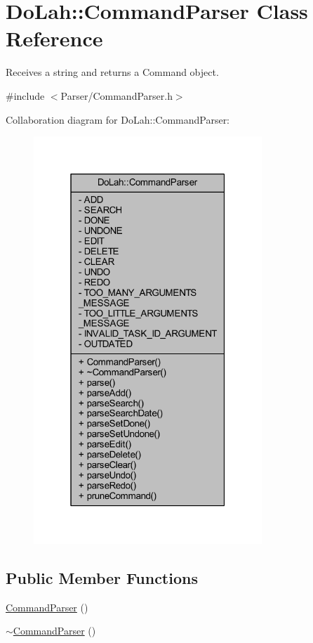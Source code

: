 \hypertarget{class_do_lah_1_1_command_parser}{}\section{Do\+Lah\+:\+:Command\+Parser Class Reference}
\label{class_do_lah_1_1_command_parser}


Receives a string and returns a Command object.  




{\ttfamily \#include $<$Parser/\+Command\+Parser.\+h$>$}



Collaboration diagram for Do\+Lah\+:\+:Command\+Parser\+:
\nopagebreak
\begin{figure}[H]
\begin{center}
\leavevmode
\includegraphics[width=244pt]{class_do_lah_1_1_command_parser__coll__graph}
\end{center}
\end{figure}
\subsection*{Public Member Functions}
\begin{DoxyCompactItemize}
\item 
\hyperlink{class_do_lah_1_1_command_parser_adcabb517afe371b22b228b392615da33}{Command\+Parser} ()
\item 
\hyperlink{class_do_lah_1_1_command_parser_a89ab2f7ccdace1eca7734b63bbe7f718}{$\sim$\+Command\+Parser} ()
\end{DoxyCompactItemize}
